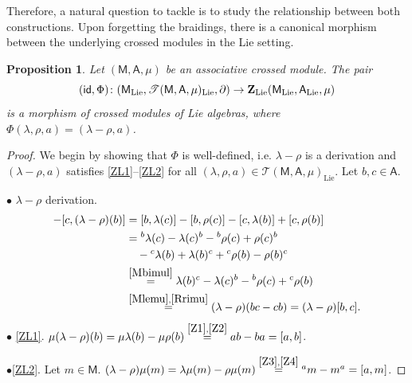 \documentclass[12pt,reqno]{amsart}
\theoremstyle{plain}
\newtheorem{proposition}[theorem]{Proposition}
\theoremstyle{definition}
\theoremstyle{remark}
\newcommand{\A}{\ensuremath{\mathsf{A}}}
\newcommand{\id}{\ensuremath{\mathsf{id}}}
\newcommand{\MM}{\ensuremath{\mathsf{M}}}
\newcommand{\ZC}{\ensuremath{\mathbf{Z}}}
\newcommand{\T}{\ensuremath{\mathcal{T}}}
\numberwithin{equation}{section}
\begin{document}
	Therefore, a natural question to tackle is to study the relationship between both constructions. Upon forgetting the braidings,
	 there is a canonical morphism between the underlying crossed modules in the Lie setting.
	
	\begin{proposition}\label{P:canmor}
		Let $(\MM,\A,\mu)$ be an associative crossed module. The pair 
		\[( \id,\Phi)\colon (\MM_{\textnormal{Lie}},\T(\MM,\A,\mu)_{\textnormal{Lie}},\partial)\rightarrow \ZC_{\textnormal{Lie}}(\MM_{\textnormal{Lie}},\A_{\textnormal{Lie}},\mu)\]
		 is a morphism of crossed modules of Lie algebras, where $\Phi(\lambda,\rho,a)=(\lambda-\rho,a)$. 
	\end{proposition}
	\begin{proof}
		We begin by showing that $\Phi$ is well-defined, i.e. $\lambda-\rho$ is a derivation and  $(\lambda-\rho,a)$ satisfies
		 \eqref{ZL1}--\eqref{ZL2} for all $(\lambda,\rho,a)\in\T(\MM,\A,\mu)_{\text{Lie}}$. Let $b,c\in\A$.
		
		$\bullet$	$\lambda-\rho$ derivation. 
			\begin{align*}
				[b,(\lambda-\rho)(c)]-[c,(\lambda-\rho)(b)]&=[b,\lambda(c)]-[b,\rho(c)]-[c,\lambda(b)]+[c,\rho(b)]\\
				&={}^b\lambda(c)-\lambda(c)^{b}-{}^b\rho(c)+\rho(c)^b\\
				&\quad-{}^c\lambda(b)+\lambda(b)^c+{}^c\rho(b)-\rho(b)^{c}\\
				&\stackrel{\eqref{Mbimul}}{=}\lambda(b)^c-\lambda(c)^b-{}^{b}\rho(c)+{}^{c}\rho(b)\\
				&\stackrel{\eqref{Mlemu},\eqref{Rrimu}}{=}(\lambda-\rho)(bc-cb)=(\lambda-\rho)[b,c].
			\end{align*}
			$\bullet$ \eqref{ZL1}. $\mu(\lambda-\rho)(b)=\mu\lambda(b)-\mu\rho(b)\stackrel{\eqref{Z1},\eqref{Z2}}{=}ab-ba=[a,b]$.
			
		\noindent	$\bullet$\eqref{ZL2}. Let $m\in \MM$. $(\lambda-\rho)\mu(m)=\lambda\mu(m)-\rho\mu(m)\stackrel{\eqref{Z3},\eqref{Z4}}{=}{}^{a}m-m^{a}=[a,m]$.		
		 

\end{proof}
\end{document}
